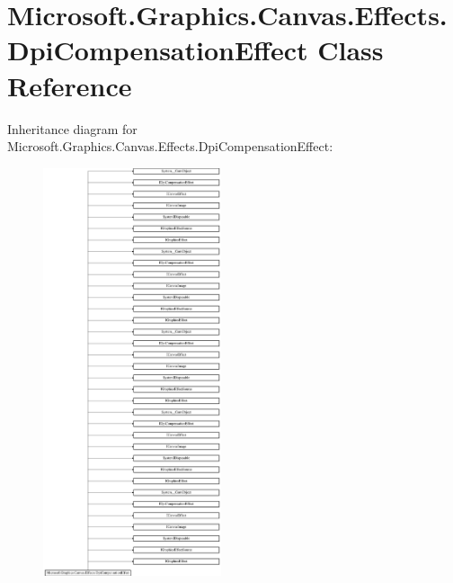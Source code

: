 \hypertarget{class_microsoft_1_1_graphics_1_1_canvas_1_1_effects_1_1_dpi_compensation_effect}{}\section{Microsoft.\+Graphics.\+Canvas.\+Effects.\+Dpi\+Compensation\+Effect Class Reference}
\label{class_microsoft_1_1_graphics_1_1_canvas_1_1_effects_1_1_dpi_compensation_effect}
Inheritance diagram for Microsoft.\+Graphics.\+Canvas.\+Effects.\+Dpi\+Compensation\+Effect\+:\begin{figure}[H]
\begin{center}
\leavevmode
\includegraphics[height=12.000000cm]{class_microsoft_1_1_graphics_1_1_canvas_1_1_effects_1_1_dpi_compensation_effect}
\end{center}
\end{figure}
